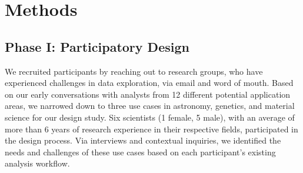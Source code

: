   \section{Methods\label{sec:methods}}
  \subsection{Phase I: Participatory Design}
  \par We recruited participants by reaching out to research groups, who have experienced challenges in data exploration, via email and word of mouth. Based on our early conversations with analysts from 12 different potential application areas, we narrowed down to three use cases in astronomy, genetics, and material science for our design study. Six scientists (1 female, 5 male), with an average of more than 6 years of research experience in their respective fields, participated in the design process. Via interviews and contextual inquiries, we identified the needs and challenges of these use cases based on each participant's existing analysis workflow. 
